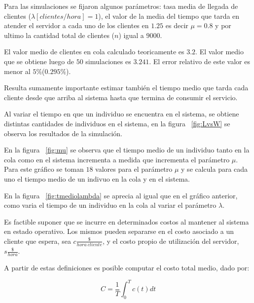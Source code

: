 \documentclass{sig-alternate}
\begin{document}
Para las simulaciones se fijaron algunos par\'{a}metros: tasa media de llegada de 
clientes ($\lambda[clientes/hora]=1$), el valor de la media del tiempo que tarda 
en atender el servidor a cada uno de los clientes en $1.25$ es decir $\mu=0.8$ 
y por ultimo la cantidad total de clientes ($n$) igual a $9000$.   

El valor medio de clientes en cola calculado teoricamente es $3.2$. El valor
medio que se obtiene luego de $50$ simulaciones es $3.241$. El error
relativo de este valor es menor al $5\%$($0.295\%$).

Resulta sumamente importante estimar tambi\'{e}n el tiempo medio que tarda
cada cliente desde que arriba al sistema hasta que termina de consumir el
servicio. 

Al variar el tiempo en que un individuo se encuentra en el sistema, se obtiene 
distintas cantidades de individuos en el sistema, en la figura ~\ref{fig:LvsW}
se observa los resultados de la simulaci\'{o}n.

En la figura ~\ref{fig:mu} se observa que el tiempo medio de un individuo
tanto en la cola como en el sistema incrementa a medida que incrementa el par\'{a}metro
$\mu$. Para este gr\'{a}fico se toman $18$ valores para el par\'{a}metro $\mu$ y se
calcula para cada uno el tiempo medio de un indivuo en la cola y en el sistema.

En la figura ~\ref{fig:tmediolambda} se aprecia al igual que en el gr\'{a}fico anterior, 
como varia el tiempo de un individuo en la cola al variar el par\'{a}metro $\lambda$.

Es factible suponer que se incurre en determinados costos al mantener al
sistema en estado operativo. Los mismos pueden separarse en el costo
asociado a un cliente que espera, sea $c\frac{\$}{hora\ cliente}$, y el costo
propio de utilizaci\'{o}n del servidor, $s\frac{\$}{hora}$.

A partir de estas definiciones es posible computar el costo total medio, dado 
por:

\begin{equation}
\label{costo_total_medio}
C = \frac{1}{T} \int_{0}^{T} c(t) dt
\end{equation}
\end{document}
